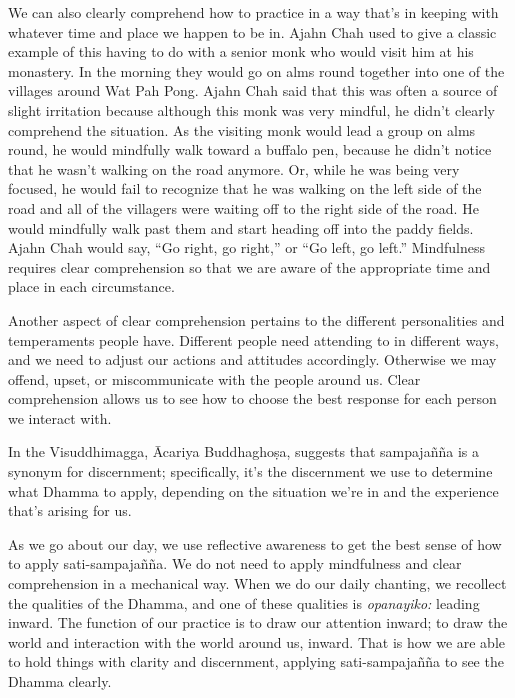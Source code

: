 We can also clearly comprehend how to practice in a way that's in 
keeping with whatever time and place we happen to be in. Ajahn Chah 
used to give a classic example of this having to do with a senior monk 
who would visit him at his monastery. In the morning they would go on 
alms round together into one of the villages around Wat Pah Pong. Ajahn 
Chah said that this was often a source of slight irritation because 
although this monk was very mindful, he didn't clearly comprehend the 
situation. As the visiting monk would lead a group on alms round, he 
would mindfully walk toward a buffalo pen, because he didn't notice 
that he wasn't walking on the road anymore. Or, while he was being very 
focused, he would fail to recognize that he was walking on the left 
side of the road and all of the villagers were waiting off to the right 
side of the road. He would mindfully walk past them and start heading 
off into the paddy fields. Ajahn Chah would say, ``Go right, go 
right,'' or ``Go left, go left.'' Mindfulness requires clear 
comprehension so that we are aware of the appropriate time and place in 
each circumstance.

Another aspect of clear comprehension pertains to the different 
personalities and temperaments people have. Different people need 
attending to in different ways, and we need to adjust our actions and 
attitudes accordingly. Otherwise we may offend, upset, or 
miscommunicate with the people around us. Clear comprehension allows us 
to see how to choose the best response for each person we interact with.

In the Visuddhimagga, Ācariya Buddhaghoṣa, suggests that 
sampajañña is a synonym for discernment; specifically, it's the 
discernment we use to determine what Dhamma to apply, depending on the 
situation we're in and the experience that's arising for us.

As we go about our day, we use reflective awareness to get the best 
sense of how to apply sati-sampajañña. We do not need to apply 
mindfulness and clear comprehension in a mechanical way. When we do our 
daily chanting, we recollect the qualities of the Dhamma, and one of 
these qualities is \emph{opanayiko:} leading inward. The function of 
our practice is to draw our attention inward; to draw the world and 
interaction with the world around us, inward. That is how we are able 
to hold things with clarity and discernment, applying sati-sampajañña 
to see the Dhamma clearly.


